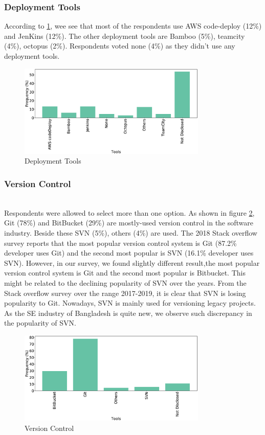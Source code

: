 \subsubsection{Deployment Tools}
According to \ref{fig:deployTools}, wee see that most of the respondents use AWS code-deploy (12\%) and JenKins (12\%). The other deployment tools are Bamboo (5\%), teamcity (4\%), octopus (2\%). Respondents voted none (4\%) as they didn’t use any deployment tools.
\begin{figure}[htbp]
\centering
  \includegraphics[width=0.8\textwidth]{Figures/Respondents_deployment_tools}
  \caption{Deployment Tools}
  \label{fig:deployTools}
\end{figure}

\subsubsection{Version Control}
\hfill\\
Respondents were allowed to select more than one option. As shown in figure \ref{fig:versionControl}, Git (78\%) and BitBucket (29\%) are mostly-used version control in the software industry. Beside these SVN (5\%), others (4\%) are used.  The 2018 Stack overflow survey\cite{StackoverflowSurvey2018} reports that  the most popular version control system is Git (87.2\% developer uses Git) and the second most popular is SVN (16.1\% developer uses SVN). However, in our survey, we found slightly different result,the most popular version control system is Git and the second most popular is Bitbucket. This might be related  to the declining popularity of SVN over the years. From the Stack overflow survey over the range 2017-2019, it is clear that SVN is losing popularity to Git. Nowadays, SVN is mainly used for versioning legacy projects. As the SE industry of Bangladesh is quite new, we observe such discrepancy in the popularity of SVN.

\begin{figure}[htbp]
\centering
  \includegraphics[width=0.8\textwidth]{Figures/Respondents_version_control}
  \caption{Version Control}
  \label{fig:versionControl}
\end{figure}